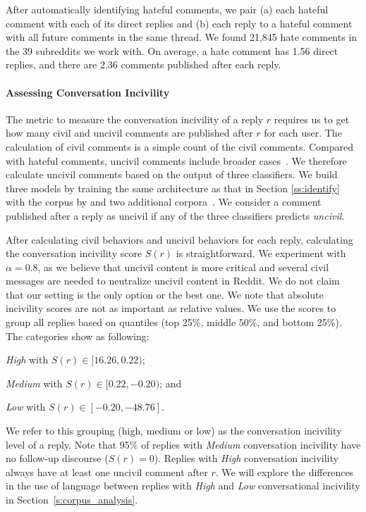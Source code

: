 \documentclass[11pt]{article}
\begin{document}
	After automatically identifying hateful comments, we pair
	(a) each hateful comment with each of its direct replies
	and
	(b) each reply to a hateful comment with all future comments in the same thread.
	We found 21,845  hate comments in the 39 subreddits we work with.
	On average, a hate comment has 1.56 direct replies,
	and there are 2.36 comments published after each reply.

	
	\paragraph{Assessing Conversation Incivility}
	\label{ss:assess}
	The metric to measure the conversation incivility of a reply $r$ requires us to get
	how many civil and uncivil comments are published after $r$ for each user.
	The calculation of civil comments is a simple count of the civil comments.
	Compared with hateful comments, uncivil comments include broader cases~\cite{davidson-etal-2020-developing}.
	We therefore calculate uncivil comments based on the output of three classifiers.
	We build three models by training the same architecture as that in Section \ref{ss:identify} with the corpus by \citet{qian-etal-2019-benchmark}
	and two additional corpora~\cite{hateoffensive,vidgen-etal-2021-introducing}.
	We consider a comment published after a reply as uncivil if any of the three classifiers predicts \emph{uncivil}. 
	
	After calculating civil behaviors and uncivil behaviors for each reply,
	calculating the conversation incivility score $S(r)$ is straightforward.
	We experiment with $\alpha = 0.8$, 
	as we believe that uncivil content is more critical and several civil messages are needed to neutralize uncivil content in Reddit.
	We do not claim that our setting is the only option or the best one. 
	We note that absolute incivility scores are not as important as relative values.
	We use the scores to group all replies based on quantiles (top 25\%, middle 50\%, and bottom 25\%). 
	The categories show as following:
	\begin{compactitem}
		\item \emph{High} with $ S(r) \in [16.26,0.22) $;
		\item \emph{Medium} with $ S(r) \in [0.22, -0.20) $; and
		\item \emph{Low} with  $ S(r) \in [-0.20, -48.76]$.
	\end{compactitem}

	We refer to this grouping (high, medium or low) as the conversation incivility level of a reply.
	Note that 95\% of replies with \emph{Medium} conversation incivility have no follow-up discourse ($S(r)=0$).   
	Replies with \emph{High} conversation incivility always have at least one uncivil comment after $r$.
	We will explore the differences in the use of language between replies with \emph{High} and \emph{Low} conversational incivility in Section~\ref{s:corpus_analysis}.
	
\end{document}
